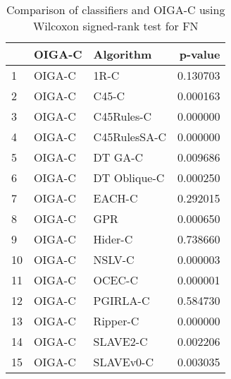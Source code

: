 \begin{table}
\footnotesize
\caption{Comparison of classifiers and OIGA-C using Wilcoxon signed-rank test for FN}
\label{tab:OIGA-C wilcoxon FN comparison}
\begin{tabular}{lllr}
\hline
 & OIGA-C & Algorithm & p-value \\
\hline
1 & OIGA-C & 1R-C & 0.130703 \\
2 & OIGA-C & C45-C & 0.000163 \\
3 & OIGA-C & C45Rules-C & 0.000000 \\
4 & OIGA-C & C45RulesSA-C & 0.000000 \\
5 & OIGA-C & DT GA-C & 0.009686 \\
6 & OIGA-C & DT Oblique-C & 0.000250 \\
7 & OIGA-C & EACH-C & 0.292015 \\
8 & OIGA-C & GPR & 0.000650 \\
9 & OIGA-C & Hider-C & 0.738660 \\
10 & OIGA-C & NSLV-C & 0.000003 \\
11 & OIGA-C & OCEC-C & 0.000001 \\
12 & OIGA-C & PGIRLA-C & 0.584730 \\
13 & OIGA-C & Ripper-C & 0.000000 \\
14 & OIGA-C & SLAVE2-C & 0.002206 \\
15 & OIGA-C & SLAVEv0-C & 0.003035 \\
\hline
\end{tabular}
\end{table}
